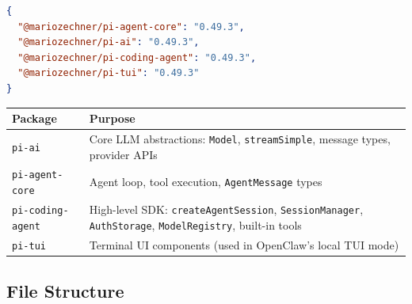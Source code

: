 \begin{lstlisting}[language=json]
{
  "@mariozechner/pi-agent-core": "0.49.3",
  "@mariozechner/pi-ai": "0.49.3",
  "@mariozechner/pi-coding-agent": "0.49.3",
  "@mariozechner/pi-tui": "0.49.3"
}
\end{lstlisting}



\begin{table}[h]
\centering
\small
\begin{tabular}{|l|l|}
\hline
Package & Purpose \\
\hline
\texttt{pi-ai} & Core LLM abstractions: \texttt{Model}, \texttt{streamSimple}, message types, provider APIs \\
\hline
\texttt{pi-agent-core} & Agent loop, tool execution, \texttt{AgentMessage} types \\
\hline
\texttt{pi-coding-agent} & High-level SDK: \texttt{createAgentSession}, \texttt{SessionManager}, \texttt{AuthStorage}, \texttt{ModelRegistry}, built-in tools \\
\hline
\texttt{pi-tui} & Terminal UI components (used in OpenClaw's local TUI mode) \\
\hline
\end{tabular}
\end{table}



\subsection{File Structure}


